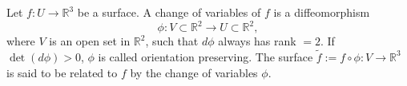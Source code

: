 Let $f: U \to \mathbb{R}^3$ be a surface. A change of variables of $f$ is a diffeomorphism
$$\phi: V \subset \mathbb{R}^2 \to U \subset \mathbb{R}^2,$$
where $V$ is an open set in $\mathbb{R}^2$, such that $d\phi$ always has rank $= 2$. If $\det(d\phi) > 0$, $\phi$ is called orientation preserving. The surface $\tilde{f} := f \circ \phi: V \to \mathbb{R}^3$ is said to be related to $f$ by the change of variables $\phi$.

